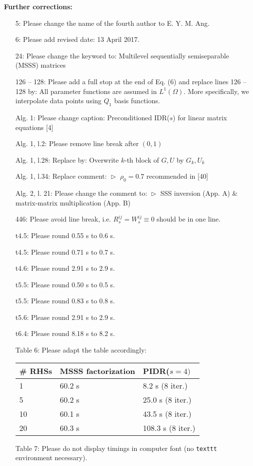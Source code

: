 \documentclass{article}
\begin{document}
\noindent \textbf{Further corrections:}

\begin{itemize}
 \item[5:] Please change the name of the fourth author to \textsf{E. Y. M. Ang}.
 \item[6:] Please add revised date: 13 April 2017.
 \item[24:] Please change the keyword to: \textsf{Multilevel sequentially semiseparable (MSSS) matrices}
 \item[126 -- 128:] Please add a full stop at the end of Eq. (6) and replace lines 126 -- 128 by: All parameter functions are assumed in $L^1(\Omega)$. More specifically, we interpolate data points using $Q_1$ basis functions.
 \item[Alg. 1:] Please change caption: Preconditioned IDR($s$) for linear matrix equations [4]
 \item[Alg. 1, l.2:] Please remove line break after $(0,1)$
 \item[Alg. 1, l.28:] Replace by: Overwrite $k$-th block of $G, U$ by $G_k, U_k$
 \item[Alg. 1, l.34:] Replace comment: \quad $\vartriangleright$ $\rho_0 = 0.7$ recommended in [40]
 \item[Alg. 2, l. 21:] Please change the comment to: \quad $\vartriangleright$ SSS inversion (App. A) \& matrix-matrix multiplication (App. B)
 \item[446:] Please avoid line break, i.e. $R_s^{ij} = W_s^{ij} \equiv 0$ should be in one line.
 \item[t4.5:] Please round 0.55 s to 0.6 s.
 \item[t4.5:] Please round 0.71 s to 0.7 s.
 \item[t4.6:] Please round 2.91 s to 2.9 s.
 \item[t5.5:] Please round 0.50 s to 0.5 s.
 \item[t5.5:] Please round 0.83 s to 0.8 s.
 \item[t5.6:] Please round 2.91 s to 2.9 s.
 \item[t6.4:] Please round 8.18 s to 8.2 s.
 \item[Table 6:] Please adapt the table accordingly:
 
 \begin{table}[H]
  \centering
  \begin{tabular}{lll}
  \hline
   \# RHSs &MSSS factorization& PIDR($s=4)$ \\
   \hline
   \phantom{0}1&60.2 s&\phantom{00}8.2 s (8 iter.) \\
   \phantom{0}5&60.2 s&\phantom{0}25.0 s (8 iter.)\\ 
   10&60.1 s&\phantom{0}43.5 s (8 iter.) \\
   20&60.3 s&108.3 s (8 iter.) \\ 
   \hline
  \end{tabular}
 \end{table}

 \item[Table 7:] Please do not display timings in computer font (no \texttt{texttt} environment necessary).
\end{itemize}
\end{document}
